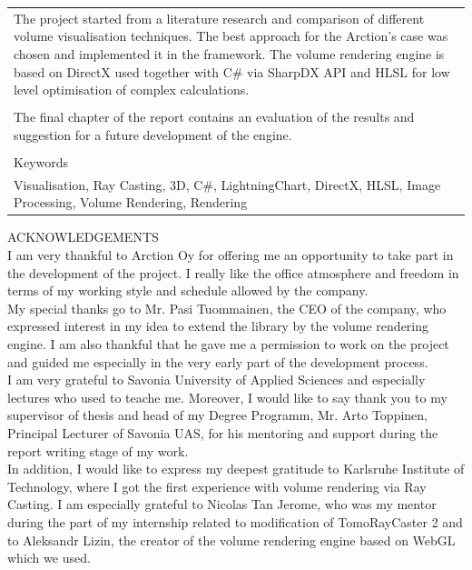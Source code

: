 \documentclass[twoside, english, 11pt]{report}
\begin{document}
\begin{table}[!h]
\begin{tabular}{| l | l | l | l |}
\multicolumn{4}{|p{14cm}|}{
The project started from a literature research and comparison of different volume visualisation techniques. The best approach for the Arction's case was chosen and implemented it in the framework. The volume rendering engine is based on DirectX used together with C\# via SharpDX API and HLSL for low level optimisation of complex calculations.
}\\
\multicolumn{4}{|l|}{ }\\
\multicolumn{4}{|p{14cm}|}{
The final chapter of the report contains an evaluation of the results and suggestion for a future development of the engine.
}\\
\multicolumn{4}{|l|}{ }\\
\hline
\multicolumn{4}{|l|}{Keywords}\\
\multicolumn{4}{|p{14cm}|}{
Visualisation, Ray Casting, 3D, C\#, LightningChart, DirectX, HLSL, Image Processing, Volume Rendering, Rendering
}\\
\hline
\end{tabular}
\end{table}

\newpage

ACKNOWLEDGEMENTS\\

I am very thankful to Arction Oy for offering me an opportunity to take part in the development of the project. I really like the office atmosphere and freedom in terms of my working style and schedule allowed by the company.\\

My special thanks go to Mr. Pasi Tuommainen, the CEO of the company, who expressed interest in my idea to extend the library by the volume rendering engine. I am also thankful that he gave me a permission to work on the project and guided me especially in the very early part of the development process.\\

I am very grateful to Savonia University of Applied Sciences and especially lectures who used to teache me.  Moreover, I would like to say thank you to my supervisor of thesis and head of my Degree Programm, Mr. Arto Toppinen, Principal Lecturer of Savonia UAS, for his mentoring and support during the report writing stage of my work. \\

In addition, I would like to express my deepest gratitude to Karlsruhe Institute of Technology, where I got the first experience with volume rendering via Ray Casting. I am especially grateful to Nicolas Tan Jerome, who was my mentor during the part of my internship related to modification of TomoRayCaster 2 and to Aleksandr Lizin, the creator of the volume rendering engine based on WebGL which we used.
\end{document}
